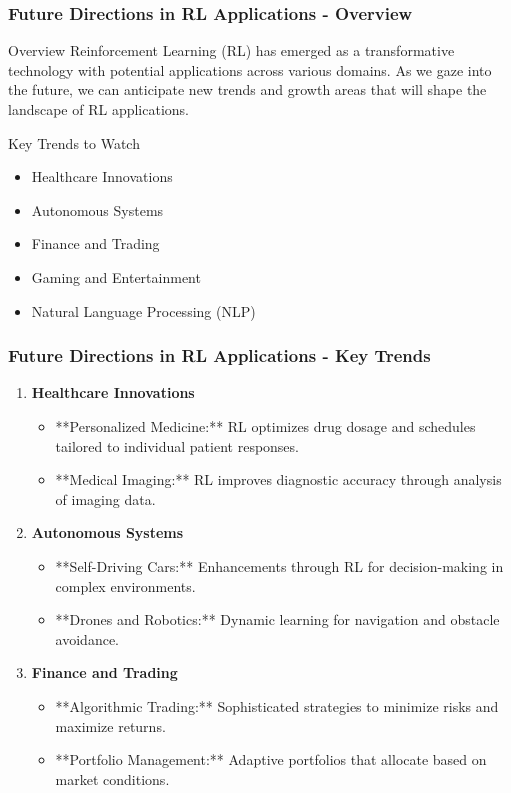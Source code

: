 \documentclass[aspectratio=169]{beamer}
\begin{document}
\begin{frame}[fragile]
  \frametitle{Future Directions in RL Applications - Overview}
  
  \begin{block}{Overview}
    Reinforcement Learning (RL) has emerged as a transformative technology with potential applications across various domains. As we gaze into the future, we can anticipate new trends and growth areas that will shape the landscape of RL applications.
  \end{block}
  
  \begin{block}{Key Trends to Watch}
    \begin{itemize}
      \item Healthcare Innovations
      \item Autonomous Systems
      \item Finance and Trading
      \item Gaming and Entertainment
      \item Natural Language Processing (NLP)
    \end{itemize}
  \end{block}
\end{frame}

\begin{frame}[fragile]
  \frametitle{Future Directions in RL Applications - Key Trends}
  
  \begin{enumerate}
    \item \textbf{Healthcare Innovations}
    \begin{itemize}
      \item **Personalized Medicine:** RL optimizes drug dosage and schedules tailored to individual patient responses.
      \item **Medical Imaging:** RL improves diagnostic accuracy through analysis of imaging data.
    \end{itemize}
    
    \item \textbf{Autonomous Systems}
    \begin{itemize}
      \item **Self-Driving Cars:** Enhancements through RL for decision-making in complex environments.
      \item **Drones and Robotics:** Dynamic learning for navigation and obstacle avoidance.
    \end{itemize}
    
    \item \textbf{Finance and Trading}
    \begin{itemize}
      \item **Algorithmic Trading:** Sophisticated strategies to minimize risks and maximize returns.
      \item **Portfolio Management:** Adaptive portfolios that allocate based on market conditions.
    \end{itemize}
  \end{enumerate}
\end{frame}
\end{document}
